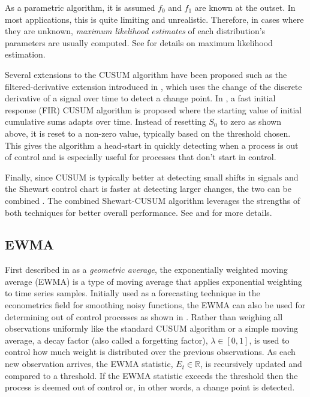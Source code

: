 As a parametric algorithm, it is assumed $f_0$ and $f_1$ are known at the outset. In most applications, this is quite limiting and unrealistic. Therefore, in cases where they are unknown, \textit{maximum likelihood estimates} of each distribution's parameters are usually computed. See \cite{kay1993fundamentals} for details on maximum likelihood estimation. 

Several extensions to the CUSUM algorithm have been proposed such as the filtered-derivative extension introduced in \cite{basseville1981edge}, which uses the change of the discrete derivative of a signal over time to detect a change point. In \cite{lucas1982fast}, a fast initial response (FIR) CUSUM algorithm is proposed where the starting value of initial cumulative sums adapts over time. Instead of resetting $S_0$ to zero as shown above, it is reset to a non-zero value, typically based on the threshold chosen. This gives the algorithm a head-start in quickly detecting when a process is out of control and is especially useful for processes that don't start in control.

Finally, since CUSUM is typically better at detecting small shifts in signals and the Shewart control chart is faster at detecting larger changes, the two can be combined \cite{lucas1982combined}. The combined Shewart-CUSUM algorithm leverages the strengths of both techniques for better overall performance. See  \cite{yashchin1985analysis} and \cite{westgard1977combined} for more details. 

\subsection{EWMA}
First described in \cite{roberts1959control} as a \textit{geometric average}, the exponentially weighted moving average (EWMA) is a type of moving average that applies exponential weighting to time series samples. Initially used as a forecasting technique in the econometrics field for smoothing noisy functions, the EWMA can also be used for determining out of control processes as shown in \cite{hunter1986exponentially}. Rather than weighing all observations uniformly like the standard CUSUM algorithm or a simple moving average, a decay factor (also called a  forgetting factor), $\lambda \in [0,1]$, is used to control how much weight is distributed over the previous observations. As each new observation arrives, the EWMA statistic, $E_t \in \mathbb{R}$, is recursively updated and compared to a threshold. If the EWMA statistic exceeds the threshold then the process is deemed out of control or, in other words, a change point is detected.

